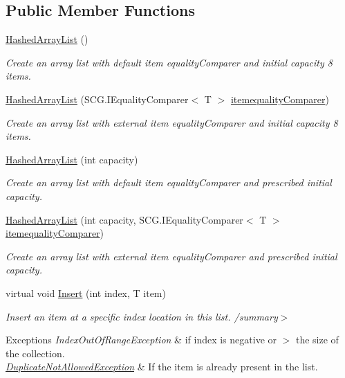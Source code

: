 \subsection*{Public Member Functions}
\begin{DoxyCompactItemize}
\item 
\hyperlink{class_c5_1_1_hashed_array_list_a95961214ec0d64d96b0097c4631966d9}{Hashed\+Array\+List} ()
\begin{DoxyCompactList}\small\item\em Create an array list with default item equality\+Comparer and initial capacity 8 items. \end{DoxyCompactList}\item 
\hyperlink{class_c5_1_1_hashed_array_list_a5ffc18cd4def3f5032aca283876ad73d}{Hashed\+Array\+List} (S\+C\+G.\+I\+Equality\+Comparer$<$ T $>$ \hyperlink{class_c5_1_1_collection_base_a95e343400be0e8f3f8d6310f1aaf2cc6}{itemequality\+Comparer})
\begin{DoxyCompactList}\small\item\em Create an array list with external item equality\+Comparer and initial capacity 8 items. \end{DoxyCompactList}\item 
\hyperlink{class_c5_1_1_hashed_array_list_a413a70096e179f4a03411f8eecb60666}{Hashed\+Array\+List} (int capacity)
\begin{DoxyCompactList}\small\item\em Create an array list with default item equality\+Comparer and prescribed initial capacity. \end{DoxyCompactList}\item 
\hyperlink{class_c5_1_1_hashed_array_list_ad65f9dcc130e9c49c211cf2744c6c38d}{Hashed\+Array\+List} (int capacity, S\+C\+G.\+I\+Equality\+Comparer$<$ T $>$ \hyperlink{class_c5_1_1_collection_base_a95e343400be0e8f3f8d6310f1aaf2cc6}{itemequality\+Comparer})
\begin{DoxyCompactList}\small\item\em Create an array list with external item equality\+Comparer and prescribed initial capacity. \end{DoxyCompactList}\item 
virtual void \hyperlink{class_c5_1_1_hashed_array_list_a9d9c830e9b1746c5527cbc5172bb2a73}{Insert} (int index, T item)
\begin{DoxyCompactList}\small\item\em Insert an item at a specific index location in this list. /summary$>$ 
\begin{DoxyExceptions}{Exceptions}
{\em Index\+Out\+Of\+Range\+Exception} & if index is negative or $>$ the size of the collection. \\
\hline
{\em \hyperlink{class_c5_1_1_duplicate_not_allowed_exception}{Duplicate\+Not\+Allowed\+Exception}} & If the item is already present in the list.\\
\hline
\end{DoxyExceptions}


\end{DoxyCompactList}
\end{DoxyCompactItemize}
